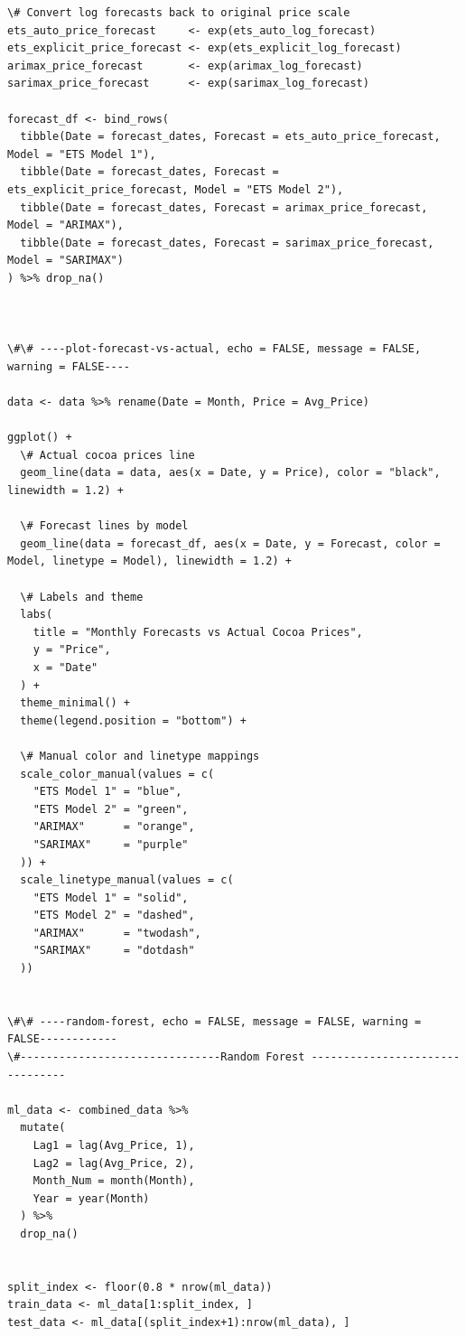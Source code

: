 \documentclass[
  letterpaper,
  DIV=11,
  numbers=noendperiod]{scrartcl}
\begin{document}
\begin{verbatim}
\# Convert log forecasts back to original price scale
ets_auto_price_forecast     <- exp(ets_auto_log_forecast)
ets_explicit_price_forecast <- exp(ets_explicit_log_forecast)
arimax_price_forecast       <- exp(arimax_log_forecast)
sarimax_price_forecast      <- exp(sarimax_log_forecast)

forecast_df <- bind_rows(
  tibble(Date = forecast_dates, Forecast = ets_auto_price_forecast, Model = "ETS Model 1"),
  tibble(Date = forecast_dates, Forecast = ets_explicit_price_forecast, Model = "ETS Model 2"),
  tibble(Date = forecast_dates, Forecast = arimax_price_forecast, Model = "ARIMAX"),
  tibble(Date = forecast_dates, Forecast = sarimax_price_forecast, Model = "SARIMAX")
) %>% drop_na()



\#\# ----plot-forecast-vs-actual, echo = FALSE, message = FALSE, warning = FALSE----

data <- data %>% rename(Date = Month, Price = Avg_Price)

ggplot() +
  \# Actual cocoa prices line
  geom_line(data = data, aes(x = Date, y = Price), color = "black", linewidth = 1.2) +
  
  \# Forecast lines by model
  geom_line(data = forecast_df, aes(x = Date, y = Forecast, color = Model, linetype = Model), linewidth = 1.2) +
  
  \# Labels and theme
  labs(
    title = "Monthly Forecasts vs Actual Cocoa Prices",
    y = "Price",
    x = "Date"
  ) +
  theme_minimal() +
  theme(legend.position = "bottom") +
  
  \# Manual color and linetype mappings
  scale_color_manual(values = c(
    "ETS Model 1" = "blue",
    "ETS Model 2" = "green",
    "ARIMAX"      = "orange",
    "SARIMAX"     = "purple"
  )) +
  scale_linetype_manual(values = c(
    "ETS Model 1" = "solid",
    "ETS Model 2" = "dashed",
    "ARIMAX"      = "twodash",
    "SARIMAX"     = "dotdash"
  ))


\#\# ----random-forest, echo = FALSE, message = FALSE, warning = FALSE------------
\#-------------------------------Random Forest --------------------------------

ml_data <- combined_data %>%
  mutate(
    Lag1 = lag(Avg_Price, 1),
    Lag2 = lag(Avg_Price, 2),
    Month_Num = month(Month),
    Year = year(Month)
  ) %>%
  drop_na()


split_index <- floor(0.8 * nrow(ml_data))
train_data <- ml_data[1:split_index, ]
test_data <- ml_data[(split_index+1):nrow(ml_data), ]


\end{verbatim}
\end{document}
